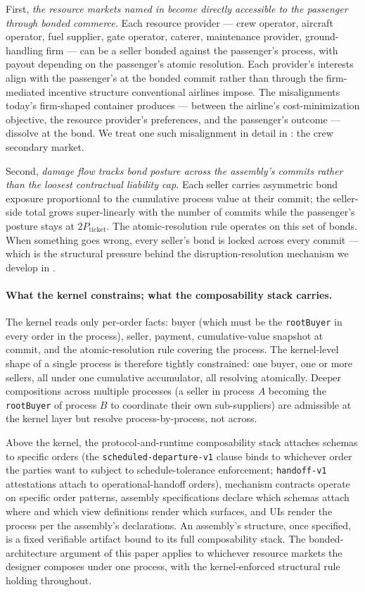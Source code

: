\documentclass[11pt,a4paper]{article}
\theoremstyle{definition}
\theoremstyle{remark}
\begin{document}
First, \emph{the resource markets named in 
become directly accessible to the passenger through bonded
commerce.} Each resource provider --- crew operator, aircraft
operator, fuel supplier, gate operator, caterer, maintenance
provider, ground-handling firm --- can be a seller bonded against
the passenger's process, with payout depending on the passenger's
atomic resolution. Each provider's interests align with the
passenger's at the bonded commit rather than through the
firm-mediated incentive structure conventional airlines impose.
The misalignments today's firm-shaped container produces ---
between the airline's cost-minimization objective, the resource
provider's preferences, and the passenger's outcome --- dissolve
at the bond. We treat one such misalignment in detail in
: the crew secondary market.

Second, \emph{damage flow tracks bond posture across the
assembly's commits rather than the loosest contractual liability
cap.} Each seller carries asymmetric bond exposure proportional
to the cumulative process value at their commit; the seller-side
total grows super-linearly with the number of commits while the
passenger's posture stays at $2 P_{\text{ticket}}$. The
atomic-resolution rule operates on this set of bonds. When
something goes wrong, every seller's bond is locked across every
commit --- which is the structural pressure behind the
disruption-resolution mechanism we develop in
.

\paragraph{What the kernel constrains; what the composability stack carries.}
The kernel reads only per-order facts: buyer (which must be the
\texttt{rootBuyer} in every order in the process), seller,
payment, cumulative-value snapshot at commit, and the
atomic-resolution rule covering the process. The kernel-level
shape of a single process is therefore tightly constrained: one
buyer, one or more sellers, all under one cumulative accumulator,
all resolving atomically. Deeper compositions across multiple
processes (a seller in process $A$ becoming the
\texttt{rootBuyer} of process $B$ to coordinate their own
sub-suppliers) are admissible at the kernel layer but resolve
process-by-process, not across.

Above the kernel, the protocol-and-runtime composability stack
attaches schemas to specific orders (the
\texttt{scheduled-departure-v1} clause binds to whichever order
the parties want to subject to schedule-tolerance enforcement;
\texttt{handoff-v1} attestations attach to operational-handoff
orders), mechanism contracts operate on specific order patterns,
assembly specifications declare which schemas attach where and
which view definitions render which surfaces, and UIs render the
process per the assembly's declarations. An assembly's structure,
once specified, is a fixed verifiable artifact bound to its full
composability stack. The bonded-architecture argument of this
paper applies to whichever resource markets the designer composes
under one process, with the kernel-enforced structural rule
holding throughout.
\end{document}
